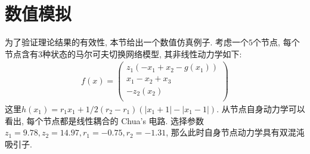 \section{数值模拟}\label{simulate}
    为了验证理论结果的有效性, 本节给出一个数值仿真例子. 考虑一个$5$个节点, 每个节点含有$3$种状态的马尔可夫切换网络模型, 其非线性动力学如下:
    \begin{align*}
           f(x)=\left(
                  \begin{array}{c}
                    z_1(-x_1+x_2-g(x_1)) \\
                    x_1-x_2+x_3 \\
                    -z_2(x_2) \\
                  \end{array}
                \right)
           \end{align*}
    这里$h(x_1)=r_1x_1+1/2(r_2-r_1)(|x_1+1|-|x_1-1|)$. 从节点自身动力学可以看出, 每个节点都是线性耦合的 Chua's 电路. 选择参数$z_1=9.78,z_2=14.97,r_1=-0.75,r_2=-1.31$, 那么此时自身节点动力学具有双混沌吸引子. 
    

